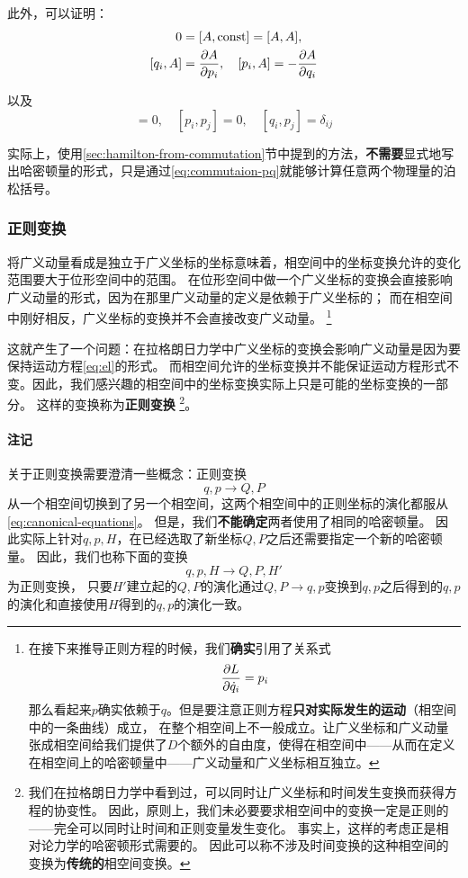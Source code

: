 \documentclass[UTF8, a4paper]{ctexart}
\newcommand*{\const}{\mathrm{const}}
\newcommand*{\comment}{\paragraph{注记}}
\begin{document}
此外，可以证明：
\begin{equation}
    \begin{aligned}
        0 &= [A, \const] = [A, A], \\
        [q_i, A] &= \pdv{A}{p_i}, \quad
        [p_i, A] = - \pdv{A}{q_i} 
    \end{aligned}
\end{equation}

以及
\begin{equation}
    [q_i, q_j] = 0, \quad [p_i, p_j] = 0, \quad [q_i, p_j] = \delta_{ij}
    \label{eq:commutaion-pq}
\end{equation}

实际上，使用\ref{sec:hamilton-from-commutation}节中提到的方法，\textbf{不需要}显式地写出哈密顿量的形式，只是通过\eqref{eq:commutaion-pq}就能够计算任意两个物理量的泊松括号。

\subsubsection{正则变换}

将广义动量看成是独立于广义坐标的坐标意味着，相空间中的坐标变换允许的变化范围要大于位形空间中的范围。
在位形空间中做一个广义坐标的变换会直接影响广义动量的形式，因为在那里广义动量的定义是依赖于广义坐标的；
而在相空间中刚好相反，广义坐标的变换并不会直接改变广义动量。%
\footnote{在接下来推导正则方程的时候，我们\textbf{确实}引用了关系式
\[
    \pdv{L}{\dot{q}_i} = p_i
\]
那么看起来$p$确实依赖于$q$。但是要注意正则方程\textbf{只对实际发生的运动}（相空间中的一条曲线）成立，
在整个相空间上不一般成立。让广义坐标和广义动量张成相空间给我们提供了$D$个额外的自由度，使得在相空间中——从而在定义在相空间上的哈密顿量中——广义动量和广义坐标相互独立。
}

这就产生了一个问题：在拉格朗日力学中广义坐标的变换会影响广义动量是因为要保持运动方程\eqref{eq:el}的形式。
而相空间允许的坐标变换并不能保证运动方程形式不变。因此，我们感兴趣的相空间中的坐标变换实际上只是可能的坐标变换的一部分。
这样的变换称为\textbf{正则变换}%
\footnote{我们在拉格朗日力学中看到过，可以同时让广义坐标和时间发生变换而获得方程的协变性。
因此，原则上，我们未必要要求相空间中的变换一定是正则的——完全可以同时让时间和正则变量发生变化。
事实上，这样的考虑正是相对论力学的哈密顿形式需要的。
因此可以称不涉及时间变换的这种相空间的变换为\textbf{传统的}相空间变换。
}。

\comment 关于正则变换需要澄清一些概念：正则变换
\[
    q, p \longrightarrow Q, P
\]
从一个相空间切换到了另一个相空间，这两个相空间中的正则坐标的演化都服从\eqref{eq:canonical-equations}。
但是，我们\textbf{不能确定}两者使用了相同的哈密顿量。
因此实际上针对$q, p, H$，在已经选取了新坐标$Q, P$之后还需要指定一个新的哈密顿量。
因此，我们也称下面的变换
\[
    q, p, H \longrightarrow Q, P, H'
\]
为正则变换，
只要$H'$建立起的$Q, P$的演化通过$Q, P \longrightarrow q, p$变换到$q, p$之后得到的$q, p$的演化和直接使用$H$得到的$q, p$的演化一致。
\end{document}
